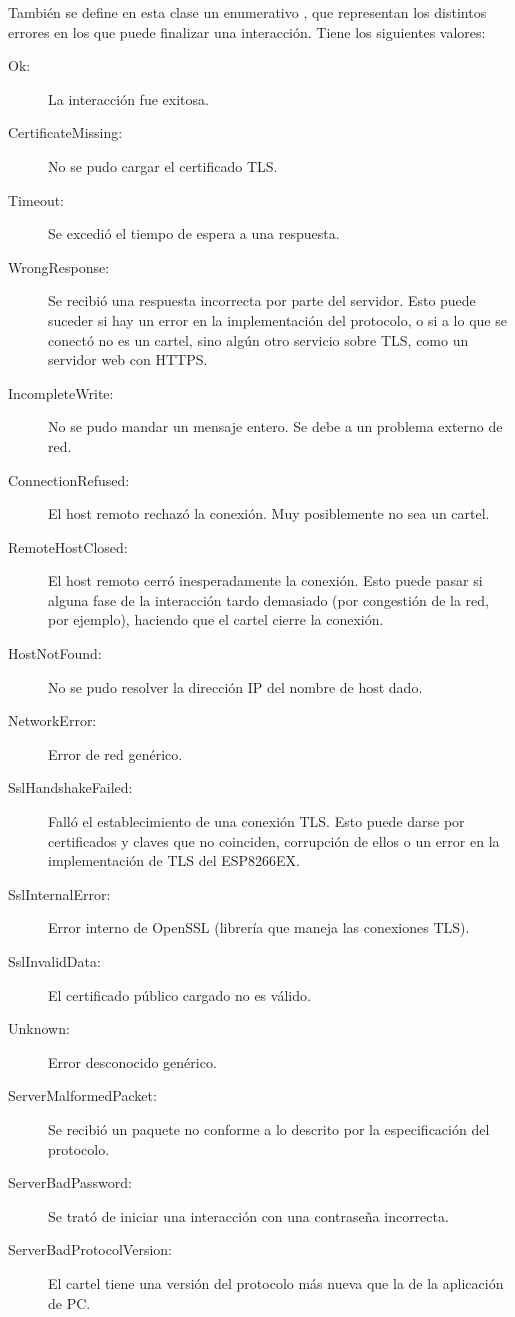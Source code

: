 También se define en esta clase un enumerativo , que representan los distintos errores en los que puede finalizar una interacción. Tiene los siguientes valores:
\begin{description}
	\item[Ok:] La interacción fue exitosa.
	\item[CertificateMissing:] No se pudo cargar el certificado TLS.
	\item[Timeout:] Se excedió el tiempo de espera a una respuesta.
	\item[WrongResponse:] Se recibió una respuesta incorrecta por parte del servidor. Esto puede suceder si hay un error en la implementación del protocolo, o si a lo que se conectó no es un cartel, sino algún otro servicio sobre TLS, como un servidor web con HTTPS.
	\item[IncompleteWrite:] No se pudo mandar un mensaje entero. Se debe a un problema externo de red.
	\item[ConnectionRefused:] El host remoto rechazó la conexión. Muy posiblemente no sea un cartel.
	\item[RemoteHostClosed:] El host remoto cerró inesperadamente la conexión. Esto puede pasar si alguna fase de la interacción tardo demasiado (por congestión de la red, por ejemplo), haciendo que el cartel cierre la conexión.
	\item[HostNotFound:] No se pudo resolver la dirección IP del nombre de host dado.
	\item[NetworkError:] Error de red genérico.
	\item[SslHandshakeFailed:] Falló el establecimiento de una conexión TLS. Esto puede darse por certificados y claves que no coinciden, corrupción de ellos o un error en la implementación de TLS del ESP8266EX.
	\item[SslInternalError:] Error interno de OpenSSL (librería que maneja las conexiones TLS).
	\item[SslInvalidData:] El certificado público cargado no es válido.
	\item[Unknown:] Error desconocido genérico.
	\item[ServerMalformedPacket:] Se recibió un paquete no conforme a lo descrito por la especificación del protocolo.
	\item[ServerBadPassword:] Se trató de iniciar una interacción con una contraseña incorrecta.
	\item[ServerBadProtocolVersion:] El cartel tiene una versión del protocolo más nueva que la de la aplicación de PC.
\end{description}
